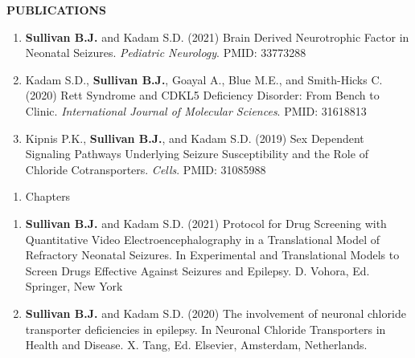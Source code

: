 \documentclass{resume} %
\begin{document}
\begin{rSection}{{\bfseries PUBLICATIONS}}
    \begin{enumerate}[resume, leftmargin=2em]
        \item {\bfseries Sullivan B.J.} and Kadam S.D. (2021) Brain Derived Neurotrophic Factor in Neonatal Seizures. \emph{Pediatric Neurology}. PMID: 33773288 
        \item Kadam S.D., {\bfseries Sullivan B.J.}, Goayal A., Blue M.E., and Smith-Hicks C. (2020) Rett Syndrome and CDKL5 Deficiency Disorder: From Bench to Clinic. \emph{International Journal of Molecular Sciences}. PMID: 31618813 
        \item Kipnis P.K., {\bfseries Sullivan B.J.}, and Kadam S.D. (2019) Sex Dependent Signaling Pathways Underlying Seizure Susceptibility and the Role of Chloride Cotransporters. \emph{Cells}. PMID: 31085988
    \end{enumerate}

    \begin{enumerate}[leftmargin=0pt]
        \item [] Chapters
    \end{enumerate}

    \begin{enumerate}[resume, leftmargin=2em]
        \item {\bfseries Sullivan B.J.} and Kadam S.D. (2021) Protocol for Drug Screening with Quantitative Video Electroencephalography in a Translational Model of Refractory Neonatal Seizures. In Experimental and Translational Models to Screen Drugs Effective Against Seizures and Epilepsy. D. Vohora, Ed. Springer, New York
        \item {\bfseries Sullivan B.J.} and Kadam S.D. (2020) The involvement of neuronal chloride transporter deficiencies in epilepsy. In Neuronal Chloride Transporters in Health and Disease. X. Tang, Ed. Elsevier, Amsterdam, Netherlands.
    \end{enumerate}     
\end{rSection}
\end{document}
